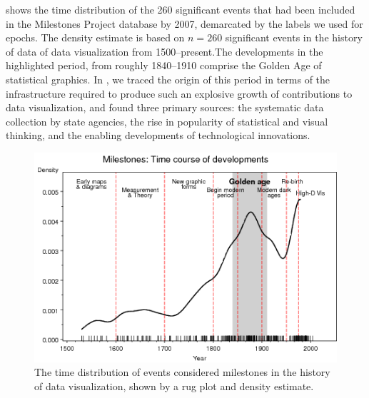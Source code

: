  shows the time distribution of the 260 significant 
events that had been included in the Milestones Project database by 2007, 
demarcated by the labels we used for epochs.  The density estimate is based on $n=260$ significant events in the history of data of data visualization from 1500--present.The developments in the highlighted period, from roughly 1840--1910 comprise the Golden Age of statistical graphics.
In \citet{Friendly:2008:golden}, we traced the origin of this period in terms 
of the infrastructure required to produce such an explosive growth of 
contributions to data visualization, and found three primary sources: the 
systematic data collection by state agencies, the rise in popularity of 
statistical and visual thinking, and the enabling developments of technological 
innovations.
\begin{figure}[!htb]
  \centering
  \includegraphics[width=.9\textwidth,clip]{fig/mileyears4}
  \caption{The time distribution of events considered milestones in the history of data visualization, shown by a rug plot and density estimate.}
  \label{fig:mileyears4}
\end{figure}